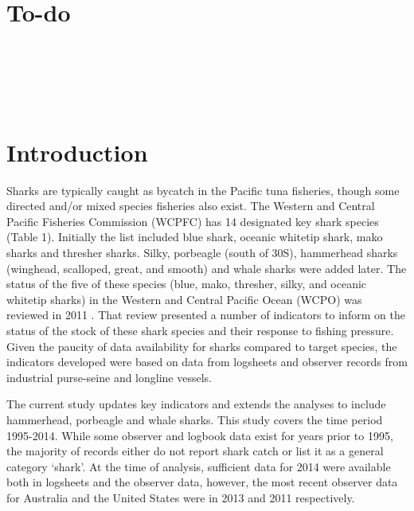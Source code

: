 \documentclass[12pt]{SCreport}
\begin{document}
\wcpfctitlepage

\tableofcontents

\section*{To-do}

\\
\\
\\
\\

\section{Introduction} %


Sharks are typically caught as bycatch in the Pacific tuna fisheries, though some directed and/or mixed species fisheries also exist. The Western and Central Pacific Fisheries Commission (WCPFC) has 14 designated key shark species (Table 1). Initially the list included blue shark, oceanic whitetip shark, mako sharks and thresher sharks. Silky, porbeagle (south of 30\degree{}S), hammerhead sharks (winghead, scalloped, great, and smooth) and whale sharks were added later.  The status of the five of these species (blue, mako, thresher, silky, and oceanic whitetip sharks) in the Western and Central Pacific Ocean (WCPO) was reviewed in 2011 \citep{Clarke2011_a, Clarke2011_b}. That review presented a number of indicators to inform on the status of the stock of these shark species and their response to fishing pressure. Given the paucity of data availability for sharks compared to target species, the indicators developed were based on data from logsheets and observer records from industrial purse-seine and longline vessels.

The current study updates key indicators and extends the analyses to include hammerhead, porbeagle and whale sharks. This study covers the time period 1995-2014. While some observer and logbook data exist for years prior to 1995, the majority of records either do not report shark catch or list it as a general category ‘shark’. At the time of analysis, sufficient data for 2014 were available both in logsheets and the observer data, however, the most recent observer data for Australia and the United States were in 2013 and 2011 respectively. 
 
\end{document}
